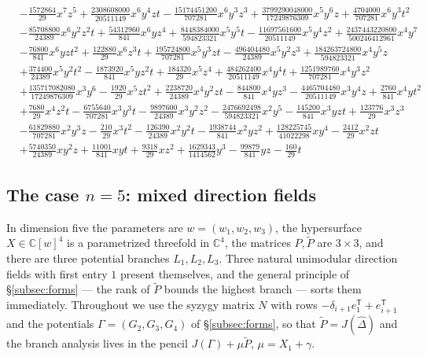 \documentclass[11pt]{article}
\theoremstyle{plain}
\theoremstyle{definition}
\theoremstyle{remark}
\newcommand{\C}{\mathbb{C}}
\begin{document}
{\begin{align*}
&-\tfrac{1572864}{29}x^7z^5+\tfrac{2308608000}{20511149}x^6y^4zt-\tfrac{15174451200}{707281}x^6y^3z^3+\tfrac{3799290048000}{17249876309}x^5y^6z+\tfrac{4704000}{707281}x^6y^3t^2\\
&-\tfrac{85708800}{24389}x^6y^2z^2t+\tfrac{54312960}{841}x^6yz^4+\tfrac{8448384000}{594823321}x^5y^5t-\tfrac{11697561600}{20511149}x^5y^4z^2+\tfrac{2437443220800}{500246412961}x^4y^7\\
&-\tfrac{76800}{841}x^6yzt^2+\tfrac{122880}{29}x^6z^3t+\tfrac{195724800}{707281}x^5y^3zt-\tfrac{496404480}{24389}x^5y^2z^3+\tfrac{184263724800}{594823321}x^4y^5z\\
&+\tfrac{374400}{24389}x^5y^2t^2-\tfrac{1873920}{841}x^5yz^2t+\tfrac{184320}{29}x^5z^4+\tfrac{484262400}{20511149}x^4y^4t+\tfrac{1251989760}{707281}x^4y^3z^2\\
&+\tfrac{135717082080}{17249876309}x^3y^6-\tfrac{1920}{29}x^5zt^2+\tfrac{2238720}{24389}x^4y^2zt-\tfrac{844800}{841}x^4yz^3-\tfrac{4465704480}{20511149}x^3y^4z+\tfrac{2760}{841}x^4yt^2\\
&+\tfrac{7680}{29}x^4z^2t-\tfrac{6755640}{707281}x^3y^3t-\tfrac{9897600}{24389}x^3y^2z^2-\tfrac{2476692498}{594823321}x^2y^5-\tfrac{145200}{841}x^3yzt+\tfrac{123776}{29}x^3z^3\\
&-\tfrac{61829880}{707281}x^2y^3z-\tfrac{210}{29}x^3t^2-\tfrac{126390}{24389}x^2y^2t-\tfrac{1938744}{841}x^2yz^2+\tfrac{128225745}{41022298}xy^4-\tfrac{2412}{29}x^2zt\\
&+\tfrac{5740350}{24389}xy^2z+\tfrac{11001}{841}xyt+\tfrac{9318}{29}xz^2+\tfrac{1629343}{1414562}y^3-\tfrac{99879}{841}yz-\tfrac{160}{29}t
\end{align*}
}

\subsection{The case $n=5$: mixed direction fields}\label{subsec:n5}

In dimension five the parameters are $w=(w_1,w_2,w_3)$, the hypersurface
$X\in\C[w]^4$ is a parametrized threefold in $\C^4$, the matrices
$P,\widetilde P$ are $3\times3$, and there are three potential branches
$L_1,L_2,L_3$. Three natural unimodular direction fields with first entry $1$
present themselves, and the general principle of \S\ref{subsec:forms} --- the
rank of $\widetilde P$ bounds the highest branch --- sorts them immediately.
Throughout we use the syzygy matrix $N$ with rows
$-\delta_{i+1}e_1^{\mathsf T}+e_{i+1}^{\mathsf T}$ and the potentials
$\Gamma=(G_2,G_3,G_4)$ of \S\ref{subsec:forms}, so that
$\widetilde P=J(\widehat\Delta)$ and the branch analysis lives in the pencil
$J(\Gamma)+\mu\widetilde P$, $\mu=X_1+\gamma$.
\end{document}

